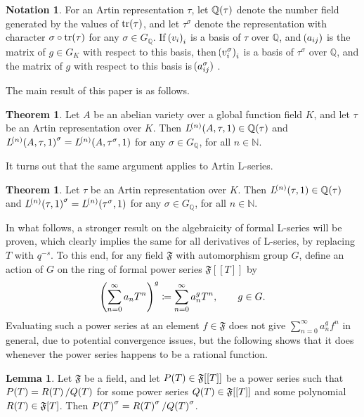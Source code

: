 \documentclass{article}
\theoremstyle{definition}
\newtheorem{lemma}[n]{Lemma}
\newtheorem{theorem}[n]{Theorem}
\theoremstyle{definition}
\newtheorem{notation}[n]{Notation}
\newcommand{\FFFF}{\mathfrak{F}}
\newcommand{\NN}{\mathbb{N}}
\newcommand{\QQ}{\mathbb{Q}}
\newcommand{\tr}{\mathrm{tr}}
\newcommand{\br}{\!\del[0]}
\begin{document}
\begin{notation}
For an Artin representation $ \tau $, let $ \QQ\br{\tau} $ denote the number field generated by the values of $ \tr\br{\tau} $, and let $ \tau^\sigma $ denote the representation with character $ \sigma \circ \tr\br{\tau} $ for any $ \sigma \in G_\QQ $. If $ \br{v_i}_i $ is a basis of $ \tau $ over $ \QQ $, and $ \br{a_{ij}} $ is the matrix of $ g \in G_K $ with respect to this basis, then $ \br{v_i^\sigma}_i $ is a basis of $ \tau^\sigma $ over $ \QQ $, and the matrix of $ g $ with respect to this basis is $ \br{a_{ij}^{\sigma}} $ \cite[Section 2.1.4]{Eva21}.
\end{notation}

The main result of this paper is as follows.

\begin{theorem}
\label{thm:hasseweil}
Let $ A $ be an abelian variety over a global function field $ K $, and let $ \tau $ be an Artin representation over $ K $. Then $ L^{\br{n}}\br{A, \tau, 1} \in \QQ\br{\tau} $ and $ L^{\br{n}}\br{A, \tau, 1}^\sigma = L^{\br{n}}\br{A, \tau^\sigma, 1} $ for any $ \sigma \in G_\QQ $, for all $ n \in \NN $.
\end{theorem}

It turns out that the same argument applies to Artin L-series.

\begin{theorem}
\label{thm:artin}
Let $ \tau $ be an Artin representation over $ K $. Then $ L^{\br{n}}\br{\tau, 1} \in \QQ\br{\tau} $ and $ L^{\br{n}}\br{\tau, 1}^\sigma = L^{\br{n}}\br{\tau^\sigma, 1} $ for any $ \sigma \in G_\QQ $, for all $ n \in \NN $.
\end{theorem}

\pagebreak

In what follows, a stronger result on the algebraicity of formal L-series will be proven, which clearly implies the same for all derivatives of L-series, by replacing $ T $ with $ q^{-s} $. To this end, for any field $ \FFFF $ with automorphism group $ G $, define an action of $ G $ on the ring of formal power series $ \FFFF[[T]] $ by
$$ \del[4]{\sum_{n = 0}^\infty a_nT^n}^g \coloneqq \sum_{n = 0}^\infty a_n^g T^n, \qquad g \in G. $$
Evaluating such a power series at an element $ f \in \FFFF $ does not give $ \sum_{n = 0}^\infty a_n^gf^n $ in general, due to potential convergence issues, but the following shows that it does whenever the power series happens to be a rational function.

\begin{lemma}
\label{lem:powerseries}
Let $ \FFFF $ be a field, and let $ P\br{T} \in \FFFF[[T]] $ be a power series such that $ P\br{T} = R\br{T} / Q\br{T} $ for some power series $ Q\br{T} \in \FFFF[[T]] $ and some polynomial $ R\br{T} \in \FFFF\sbr{T} $. Then $ P\br{T}^\sigma = R\br{T}^\sigma / Q\br{T}^\sigma $.
\end{lemma}
\end{document}

